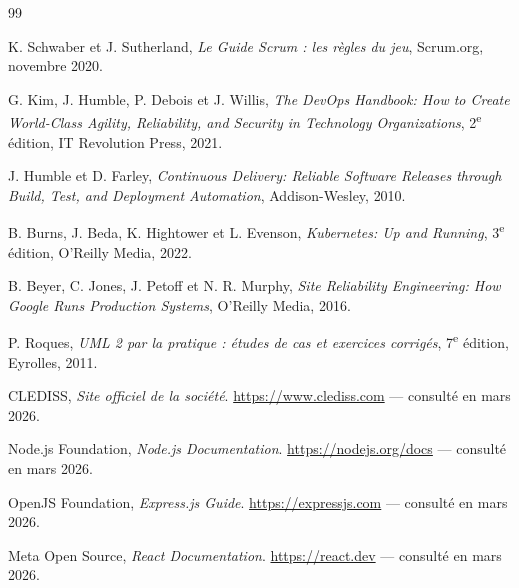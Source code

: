 \thispagestyle{fancy}

\renewcommand{\bibname}{Bibliographie et Netographie}

\begin{thebibliography}{99}

K. Schwaber et J. Sutherland, \textit{Le Guide Scrum : les règles du jeu},
Scrum.org, novembre 2020.

G. Kim, J. Humble, P. Debois et J. Willis, \textit{The DevOps Handbook: How to Create
World-Class Agility, Reliability, and Security in Technology Organizations},
2\textsuperscript{e} édition, IT Revolution Press, 2021.

J. Humble et D. Farley, \textit{Continuous Delivery: Reliable Software Releases through
Build, Test, and Deployment Automation}, Addison-Wesley, 2010.

B. Burns, J. Beda, K. Hightower et L. Evenson, \textit{Kubernetes: Up and Running},
3\textsuperscript{e} édition, O'Reilly Media, 2022.

B. Beyer, C. Jones, J. Petoff et N. R. Murphy, \textit{Site Reliability Engineering: How
Google Runs Production Systems}, O'Reilly Media, 2016.

P. Roques, \textit{UML 2 par la pratique : études de cas et exercices corrigés},
7\textsuperscript{e} édition, Eyrolles, 2011.

CLEDISS, \textit{Site officiel de la société}.
\url{https://www.clediss.com} --- consulté en mars 2026.

Node.js Foundation, \textit{Node.js Documentation}.
\url{https://nodejs.org/docs} --- consulté en mars 2026.

OpenJS Foundation, \textit{Express.js Guide}.
\url{https://expressjs.com} --- consulté en mars 2026.

Meta Open Source, \textit{React Documentation}.
\url{https://react.dev} --- consulté en mars 2026.


\end{thebibliography}
